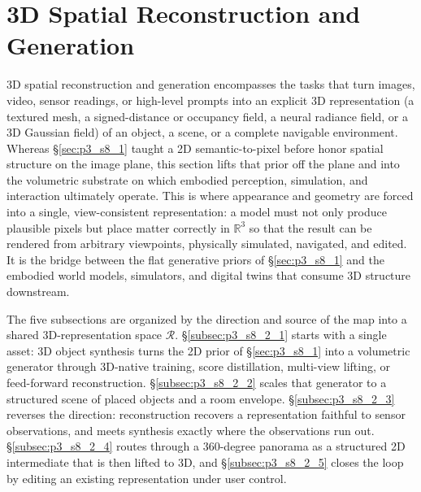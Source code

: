 
\section{3D Spatial Reconstruction and Generation}
\label{sec:p3_s8_2}

 3D spatial reconstruction and generation encompasses the tasks that turn images, video, sensor readings, or high-level prompts into an explicit 3D representation (a textured mesh, a signed-distance or occupancy field, a neural radiance field, or a 3D Gaussian field) of an object, a scene, or a complete navigable environment.
Whereas §\ref{sec:p3_s8_1} taught a 2D semantic-to-pixel before honor spatial structure on the image plane, this section lifts that prior off the plane and into the volumetric substrate on which embodied perception, simulation, and interaction ultimately operate.
This is where appearance and geometry are forced into a single, view-consistent representation: a model must not only produce plausible pixels but place matter correctly in $\mathbb{R}^3$ so that the result can be rendered from arbitrary viewpoints, physically simulated, navigated, and edited. It is the bridge between the flat generative priors of §\ref{sec:p3_s8_1} and the embodied world models, simulators, and digital twins that consume 3D structure downstream.

The five subsections are organized by the direction and source of the map into a shared 3D-representation space $\mathcal{R}$.
§\ref{subsec:p3_s8_2_1} starts with a single asset: 3D object synthesis turns the 2D prior of §\ref{sec:p3_s8_1} into a volumetric generator through 3D-native training, score distillation, multi-view lifting, or feed-forward reconstruction.
§\ref{subsec:p3_s8_2_2} scales that generator to a structured scene of placed objects and a room envelope.
§\ref{subsec:p3_s8_2_3} reverses the direction: reconstruction recovers a representation faithful to sensor observations, and meets synthesis exactly where the observations run out.
§\ref{subsec:p3_s8_2_4} routes through a 360-degree panorama as a structured 2D intermediate that is then lifted to 3D, and §\ref{subsec:p3_s8_2_5} closes the loop by editing an existing representation under user control.









